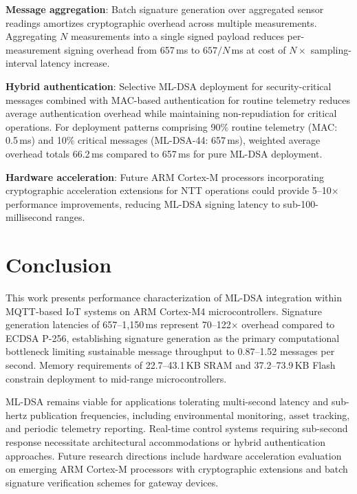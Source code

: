 \documentclass[final, twoside]{IEEEtran} %
\begin{document}
\textbf{Message aggregation}: Batch signature generation over aggregated sensor readings amortizes cryptographic overhead across multiple measurements. Aggregating $N$ measurements into a single signed payload reduces per-measurement signing overhead from 657\,ms to $657/N$\,ms at cost of $N \times$ sampling-interval latency increase.

\textbf{Hybrid authentication}: Selective ML-DSA deployment for security-critical messages combined with MAC-based authentication for routine telemetry reduces average authentication overhead while maintaining non-repudiation for critical operations. For deployment patterns comprising 90\% routine telemetry (MAC: 0.5\,ms) and 10\% critical messages (ML-DSA-44: 657\,ms), weighted average overhead totals 66.2\,ms compared to 657\,ms for pure ML-DSA deployment.

\textbf{Hardware acceleration}: Future ARM Cortex-M processors incorporating cryptographic acceleration extensions for NTT operations could provide 5--10$\times$ performance improvements, reducing ML-DSA signing latency to sub-100-millisecond ranges.

\section{Conclusion}\label{sec:conclusion}

This work presents performance characterization of ML-DSA integration within MQTT-based IoT systems on ARM Cortex-M4 microcontrollers. Signature generation latencies of 657--1,150\,ms represent 70--122$\times$ overhead compared to ECDSA P-256, establishing signature generation as the primary computational bottleneck limiting sustainable message throughput to 0.87--1.52 messages per second. Memory requirements of 22.7--43.1\,KB SRAM and 37.2--73.9\,KB Flash constrain deployment to mid-range microcontrollers.

ML-DSA remains viable for applications tolerating multi-second latency and sub-hertz publication frequencies, including environmental monitoring, asset tracking, and periodic telemetry reporting. Real-time control systems requiring sub-second response necessitate architectural accommodations or hybrid authentication approaches. Future research directions include hardware acceleration evaluation on emerging ARM Cortex-M processors with cryptographic extensions and batch signature verification schemes for gateway devices.



\end{document}
